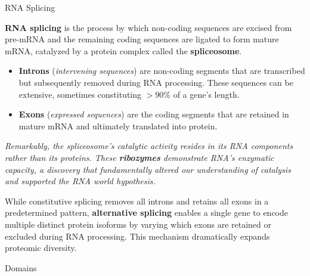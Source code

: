 \documentclass[10pt]{article}
\begin{document}
    \begin{core}[label=core:rna_splicing]{RNA Splicing}
      
      \textbf{RNA splicing} is the process by which non-coding sequences are excised from pre-mRNA and the remaining coding sequences are ligated to form mature mRNA, catalyzed by a protein complex called the \textbf{spliceosome}.


      \begin{itemize}

        \item \textbf{Introns} (\textit{intervening sequences}) are non-coding segments that are transcribed but subsequently removed during RNA processing. These sequences can be extensive, sometimes constituting $>90\%$ of a gene's length.

        \item \textbf{Exons} (\textit{expressed sequences}) are the coding segments that are retained in mature mRNA and ultimately translated into protein. 

      \end{itemize} 
             
      \textit{Remarkably, the spliceosome's catalytic activity resides in its RNA components rather than its proteins. These \textbf{ribozymes} demonstrate RNA's enzymatic capacity, a discovery that fundamentally altered our understanding of catalysis and supported the RNA world hypothesis.}

      While constitutive splicing removes all introns and retains all exons in a predetermined pattern, \textbf{alternative splicing} enables a single gene to encode multiple distinct protein isoforms by varying which exons are retained or excluded during RNA processing. This mechanism dramatically expands proteomic diversity.

    \end{core}

    \begin{core}{Domains}

      
    \end{core}
\end{document}
